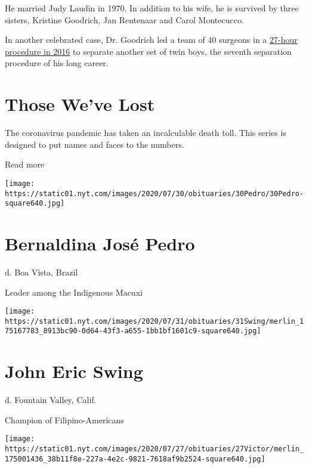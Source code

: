 He married Judy Laudin in 1970. In addition to his wife, he is survived
by three sisters, Kristine Goodrich, Jan Rentenaar and Carol Montecucco.

In another celebrated case, Dr. Goodrich led a team of 40 surgeons in a
\href{https://www.cnn.com/2020/03/30/health/new-york-neurosurgeon-death-coronavirus-mcdonald-twins/index.html}{27-hour
procedure in 2016} to separate another set of twin boys, the seventh
separation procedure of his long career.

\href{https://www.nytimes.com/interactive/2020/obituaries/people-died-coronavirus-obituaries.html?action=click\&pgtype=Article\&state=default\&region=BELOW_MAIN_CONTENT\&context=covid_obits_promo}{}

\hypertarget{those-weve-lost}{%
\section{Those We've Lost}\label{those-weve-lost}}

The coronavirus pandemic has taken an incalculable death toll. This
series is designed to put names and faces to the numbers.

Read more

\texttt{[image: https://static01.nyt.com/images/2020/07/30/obituaries/30Pedro/30Pedro-square640.jpg]}

\hypertarget{bernaldina-josuxe9-pedro}{%
\section{Bernaldina José Pedro}\label{bernaldina-josuxe9-pedro}}

d. Boa Vista, Brazil

Leader among the Indigenous Macuxi

\texttt{[image: https://static01.nyt.com/images/2020/07/31/obituaries/31Swing/merlin\_175167783\_8913bc90-0d64-43f3-a655-1bb1bf1601c9-square640.jpg]}

\hypertarget{john-eric-swing}{%
\section{John Eric Swing}\label{john-eric-swing}}

d. Fountain Valley, Calif.

Champion of Filipino-Americans

\texttt{[image: https://static01.nyt.com/images/2020/07/27/obituaries/27Victor/merlin\_175001436\_38b11f8e-227a-4e2c-9821-7618af9b2524-square640.jpg]}

